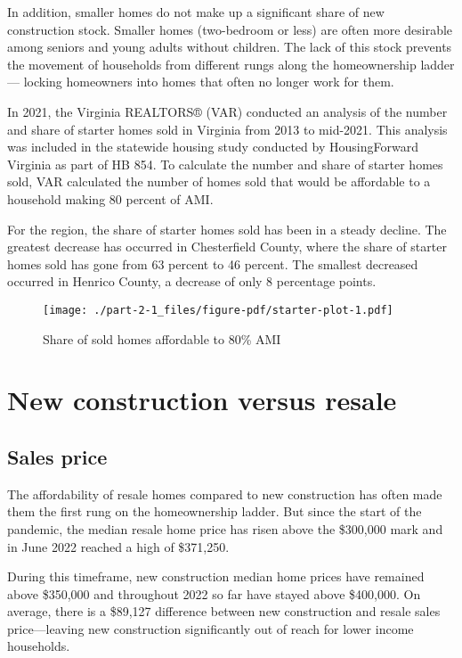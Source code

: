 \documentclass[
  letterpaper,
  DIV=11,
  numbers=noendperiod]{scrreprt}
\begin{document}
In addition, smaller homes do not make up a significant share of new
construction stock. Smaller homes (two-bedroom or less) are often more
desirable among seniors and young adults without children. The lack of
this stock prevents the movement of households from different rungs
along the homeownership ladder --- locking homeowners into homes that
often no longer work for them.

In 2021, the Virginia REALTORS® (VAR) conducted an analysis of the
number and share of starter homes sold in Virginia from 2013 to
mid-2021. This analysis was included in the statewide housing study
conducted by HousingForward Virginia as part of HB 854. To calculate the
number and share of starter homes sold, VAR calculated the number of
homes sold that would be affordable to a household making 80 percent of
AMI.

For the region, the share of starter homes sold has been in a steady
decline. The greatest decrease has occurred in Chesterfield County,
where the share of starter homes sold has gone from 63 percent to 46
percent. The smallest decreased occurred in Henrico County, a decrease
of only 8 percentage points.

\begin{figure}

{\centering \texttt{[image: ./part-2-1\_files/figure-pdf/starter-plot-1.pdf]}

}

\caption{Share of sold homes affordable to 80\% AMI}

\end{figure}

\hypertarget{new-construction-versus-resale}{%
\section{New construction versus
resale}\label{new-construction-versus-resale}}

\hypertarget{sales-price-1}{%
\subsection{Sales price}\label{sales-price-1}}

The affordability of resale homes compared to new construction has often
made them the first rung on the homeownership ladder. But since the
start of the pandemic, the median resale home price has risen above the
\$300,000 mark and in June 2022 reached a high of \$371,250.

During this timeframe, new construction median home prices have remained
above \$350,000 and throughout 2022 so far have stayed above \$400,000.
On average, there is a \$89,127 difference between new construction and
resale sales price---leaving new construction significantly out of reach
for lower income households.
\end{document}

